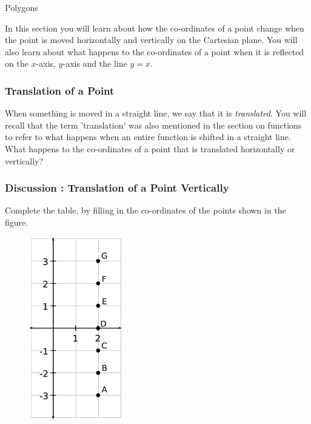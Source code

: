 \begin{exercises}{Polygons}
      
      \label{m39358*id70076}In this section you will learn about how the co-ordinates of a point change when the point is moved horizontally and vertically on the Cartesian plane. You will also learn about what happens to the co-ordinates of a point when it is reflected on the $x$-axis, $y$-axis and the line $y=x$.\par 
      \label{m39358*uid569}
            \subsubsection{ Translation of a Point}
            \nopagebreak
            
        
        \label{m39358*id70123}When something is moved in a straight line, we say that it is \textsl{translated}. You will recall that the term 'translation' was also mentioned in the section on functions to refer to what happens when an entire function is shifted in a straight line. What happens to the co-ordinates of a point that is translated horizontally or vertically?\par 
\label{m39358*secfhsst!!!underscore!!!id2414}
            \subsubsection{  Discussion : Translation of a Point Vertically }
            \nopagebreak
            
        \label{m39358*id70140}Complete the table, by filling in the co-ordinates of the points shown in the figure.\par 
        \label{m39358*id70146}
          
    \setcounter{subfigure}{0}


	\begin{figure}[H] %
    \begin{center}
    \label{m39358*id70150!!!underscore!!!media}\label{m39358*id70150!!!underscore!!!printimage}\includegraphics[height=300px]{col11306.imgs/m39358_MG10C14_022.png} %
        

\end{center}
\end{figure}
\end{exercises}
